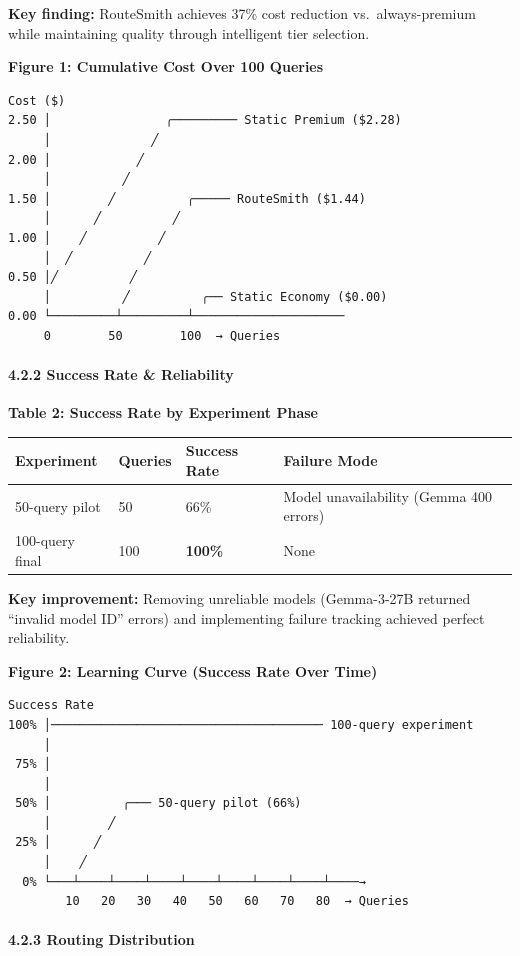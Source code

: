 \documentclass[
  11pt,
]{article}
\begin{document}
\textbf{Key finding:} RouteSmith achieves 37\% cost reduction
vs.~always-premium while maintaining quality through intelligent tier
selection.

\textbf{Figure 1: Cumulative Cost Over 100 Queries}

\begin{verbatim}
Cost ($)
2.50 │                ╭───────── Static Premium ($2.28)
     │              ╱
2.00 │            ╱
     │          ╱
1.50 │        ╱          ╭───── RouteSmith ($1.44)
     │      ╱          ╱
1.00 │    ╱          ╱
     │  ╱          ╱
0.50 │╱          ╱
     │          ╱          ╭── Static Economy ($0.00)
0.00 └─────────┴─────────┴─────────────────────
     0        50        100  → Queries
\end{verbatim}

\hypertarget{success-rate-reliability}{%
\paragraph{4.2.2 Success Rate \&
Reliability}\label{success-rate-reliability}}

\textbf{Table 2: Success Rate by Experiment Phase}

\begin{longtable}[]{@{}llll@{}}
\toprule
Experiment & Queries & Success Rate & Failure Mode \\
\midrule
\endhead
50-query pilot & 50 & 66\% & Model unavailability (Gemma 400 errors) \\
100-query final & 100 & \textbf{100\%} & None \\
\bottomrule
\end{longtable}

\textbf{Key improvement:} Removing unreliable models (Gemma-3-27B
returned ``invalid model ID'' errors) and implementing failure tracking
achieved perfect reliability.

\textbf{Figure 2: Learning Curve (Success Rate Over Time)}

\begin{verbatim}
Success Rate
100% │────────────────────────────────────── 100-query experiment
     │
 75% │
     │
 50% │          ╭─── 50-query pilot (66%)
     │        ╱
 25% │      ╱
     │    ╱
  0% └───┴────┴────┴────┴────┴────┴────┴────┴────→
        10   20   30   40   50   60   70   80  → Queries
\end{verbatim}

\hypertarget{routing-distribution-1}{%
\paragraph{4.2.3 Routing Distribution}\label{routing-distribution-1}}
\end{document}
